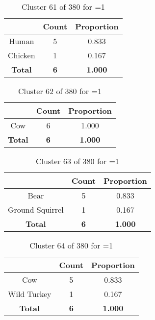 \begin{table}[ht!]
\centering
\begin{tabular}{|c|c|c|}
\hline
\bf \Spec{} &\bf Count &\bf Proportion\\ \hline \hline
Human & 5 & 0.833\\ \hline
Chicken & 1 & 0.167\\ \hline
\hline
\bf Total & \bf 6 & \bf 1.000\\ \hline
\end{tabular}
\label{tab:cluster:61:1}
\caption{Cluster 61 of 380 for \minneigh{}=1}
\end{table}

\begin{table}[ht!]
\centering
\begin{tabular}{|c|c|c|}
\hline
\bf \Spec{} &\bf Count &\bf Proportion\\ \hline \hline
Cow & 6 & 1.000\\ \hline
\hline
\bf Total & \bf 6 & \bf 1.000\\ \hline
\end{tabular}
\label{tab:cluster:62:1}
\caption{Cluster 62 of 380 for \minneigh{}=1}
\end{table}

\begin{table}[ht!]
\centering
\begin{tabular}{|c|c|c|}
\hline
\bf \Spec{} &\bf Count &\bf Proportion\\ \hline \hline
Bear & 5 & 0.833\\ \hline
Ground Squirrel & 1 & 0.167\\ \hline
\hline
\bf Total & \bf 6 & \bf 1.000\\ \hline
\end{tabular}
\label{tab:cluster:63:1}
\caption{Cluster 63 of 380 for \minneigh{}=1}
\end{table}

\begin{table}[ht!]
\centering
\begin{tabular}{|c|c|c|}
\hline
\bf \Spec{} &\bf Count &\bf Proportion\\ \hline \hline
Cow & 5 & 0.833\\ \hline
Wild Turkey & 1 & 0.167\\ \hline
\hline
\bf Total & \bf 6 & \bf 1.000\\ \hline
\end{tabular}
\label{tab:cluster:64:1}
\caption{Cluster 64 of 380 for \minneigh{}=1}
\end{table}

